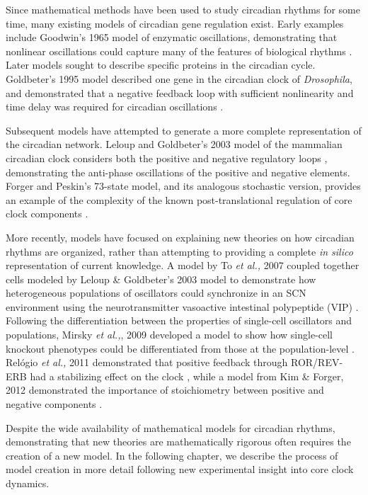 Since mathematical methods have been used to study circadian rhythms for some time, many existing models of circadian gene regulation exist.
Early examples include Goodwin's 1965 model of enzymatic oscillations, demonstrating that nonlinear oscillations could capture many of the features of biological rhythms \cite{Goodwin1965}. 
Later models sought to describe specific proteins in the circadian cycle. 
Goldbeter's 1995 model described one gene in the circadian clock of {\it Drosophila}, and demonstrated that a negative feedback loop with sufficient nonlinearity and time delay was required for circadian oscillations \cite{Goldbeter1995}.

Subsequent models have attempted to generate a more complete representation of the circadian network. 
Leloup and Goldbeter's 2003 model of the mammalian circadian clock considers both the positive and negative regulatory loops \cite{Leloup2003}, demonstrating the anti-phase oscillations of the positive and negative elements. 
Forger and Peskin's 73-state model, and its analogous stochastic version, provides an example of the complexity of the known post-translational regulation of core clock components \cite{Forger2003,Forger2005}.

More recently, models have focused on explaining new theories on how circadian rhythms are organized, rather than attempting to providing a complete {\itshape in silico} representation of current knowledge.
A model by To {\itshape et al.,} 2007 coupled together cells modeled by Leloup \& Goldbeter's 2003 model to demonstrate how heterogeneous populations of oscillators could synchronize in an SCN environment using the neurotransmitter vasoactive intestinal polypeptide (VIP) \cite{To2007}.
Following the differentiation between the properties of single-cell oscillators and populations, Mirsky {\itshape et al.,}, 2009 developed a model to show how single-cell knockout phenotypes could be differentiated from those at the population-level \cite{Mirsky2009}.
Rel{\'o}gio {\itshape et al.,} 2011 demonstrated that positive feedback through ROR/REV-ERB had a stabilizing effect on the clock \cite{Relogio2011}, while a model from Kim \& Forger, 2012 demonstrated the importance of stoichiometry between positive and negative components \cite{Kim2012}.

Despite the wide availability of mathematical models for circadian rhythms, demonstrating that new theories are mathematically rigorous often requires the creation of a new model. In the following chapter, we describe the process of model creation in more detail following new experimental insight into core clock dynamics.

